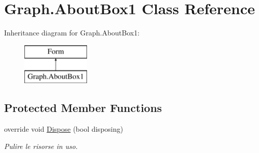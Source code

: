 \hypertarget{class_graph_1_1_about_box1}{}\section{Graph.\+About\+Box1 Class Reference}
\label{class_graph_1_1_about_box1}
Inheritance diagram for Graph.\+About\+Box1\+:\begin{figure}[H]
\begin{center}
\leavevmode
\includegraphics[height=2.000000cm]{class_graph_1_1_about_box1}
\end{center}
\end{figure}
\subsection*{Protected Member Functions}
\begin{DoxyCompactItemize}
\item 
override void \hyperlink{class_graph_1_1_about_box1_a972150c43ff56c63ca2172f781c56ec9}{Dispose} (bool disposing)
\begin{DoxyCompactList}\small\item\em Pulire le risorse in uso. \end{DoxyCompactList}\end{DoxyCompactItemize}
